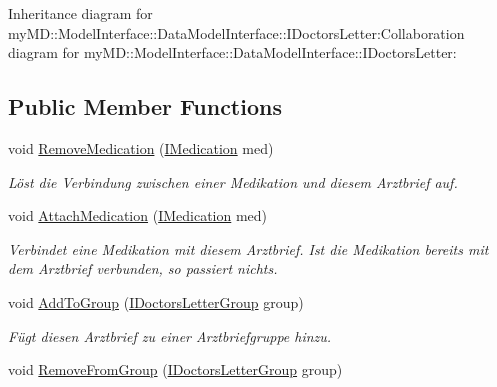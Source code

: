 Inheritance diagram for my\-MD::Model\-Interface::Data\-Model\-Interface::IDoctors\-Letter:Collaboration diagram for my\-MD::Model\-Interface::Data\-Model\-Interface::IDoctors\-Letter:\subsection*{Public Member Functions}
\begin{CompactItemize}
\item 
void \hyperlink{interfacemy_m_d_1_1_model_interface_1_1_data_model_interface_1_1_i_doctors_letter_21bff2bea1b5f08bc7e79dd65b9ccf16}{Remove\-Medication} (\hyperlink{interfacemy_m_d_1_1_model_interface_1_1_data_model_interface_1_1_i_medication}{IMedication} med)
\begin{CompactList}\small\item\em L\"{o}st die Verbindung zwischen einer Medikation und diesem Arztbrief auf. \item\end{CompactList}\item 
void \hyperlink{interfacemy_m_d_1_1_model_interface_1_1_data_model_interface_1_1_i_doctors_letter_d30d4a881bdfd437b1b1da6f3fa7cb38}{Attach\-Medication} (\hyperlink{interfacemy_m_d_1_1_model_interface_1_1_data_model_interface_1_1_i_medication}{IMedication} med)
\begin{CompactList}\small\item\em Verbindet eine Medikation mit diesem Arztbrief. Ist die Medikation bereits mit dem Arztbrief verbunden, so passiert nichts. \item\end{CompactList}\item 
void \hyperlink{interfacemy_m_d_1_1_model_interface_1_1_data_model_interface_1_1_i_doctors_letter_06720c4c5d7e38157063166e916bbf8a}{Add\-To\-Group} (\hyperlink{interfacemy_m_d_1_1_model_interface_1_1_data_model_interface_1_1_i_doctors_letter_group}{IDoctors\-Letter\-Group} group)
\begin{CompactList}\small\item\em F\"{u}gt diesen Arztbrief zu einer Arztbriefgruppe hinzu. \item\end{CompactList}\item 
void \hyperlink{interfacemy_m_d_1_1_model_interface_1_1_data_model_interface_1_1_i_doctors_letter_921a6a4ce8826ab9e42d5d5b22a5bc79}{Remove\-From\-Group} (\hyperlink{interfacemy_m_d_1_1_model_interface_1_1_data_model_interface_1_1_i_doctors_letter_group}{IDoctors\-Letter\-Group} group)

\end{CompactItemize}
